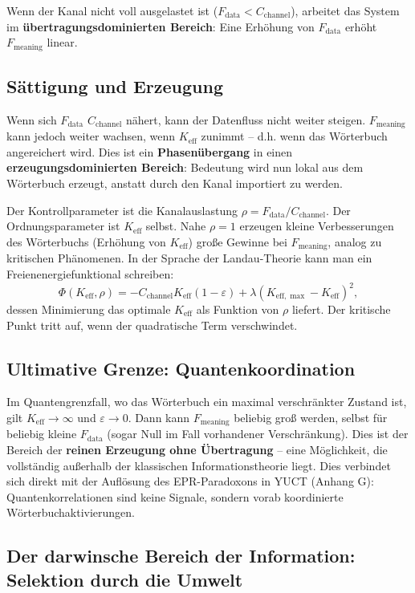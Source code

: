 \documentclass[12pt,a4paper]{article}
\theoremstyle{remark}
\newcommand{\Keff}{K_{\mathrm{eff}}}
\newcommand{\Keffmax}{K_{\mathrm{eff},\max}}
\begin{document}
	Wenn der Kanal nicht voll ausgelastet ist ($F_{\text{data}} < C_{\text{channel}}$), arbeitet das System im \textbf{übertragungsdominierten Bereich}: Eine Erhöhung von $F_{\text{data}}$ erhöht $F_{\text{meaning}}$ linear.
	
	\subsection{Sättigung und Erzeugung}
	
	Wenn sich $F_{\text{data}}$ $C_{\text{channel}}$ nähert, kann der Datenfluss nicht weiter steigen. $F_{\text{meaning}}$ kann jedoch weiter wachsen, wenn $\Keff$ zunimmt – d.h. wenn das Wörterbuch angereichert wird. Dies ist ein \textbf{Phasenübergang} in einen \textbf{erzeugungsdominierten Bereich}: Bedeutung wird nun lokal aus dem Wörterbuch erzeugt, anstatt durch den Kanal importiert zu werden.
	
	Der Kontrollparameter ist die Kanalauslastung $\rho = F_{\text{data}} / C_{\text{channel}}$. Der Ordnungsparameter ist $\Keff$ selbst. Nahe $\rho = 1$ erzeugen kleine Verbesserungen des Wörterbuchs (Erhöhung von $\Keff$) große Gewinne bei $F_{\text{meaning}}$, analog zu kritischen Phänomenen. In der Sprache der Landau-Theorie kann man ein Freienenergiefunktional schreiben:
	\[
	\Phi(\Keff, \rho) = -C_{\text{channel}} \Keff (1 - \varepsilon) + \lambda (\Keffmax - \Keff)^2,
	\]
	dessen Minimierung das optimale $\Keff$ als Funktion von $\rho$ liefert. Der kritische Punkt tritt auf, wenn der quadratische Term verschwindet.
	
	\subsection{Ultimative Grenze: Quantenkoordination}
	
	Im Quantengrenzfall, wo das Wörterbuch ein maximal verschränkter Zustand ist, gilt $\Keff \to \infty$ und $\varepsilon \to 0$. Dann kann $F_{\text{meaning}}$ beliebig groß werden, selbst für beliebig kleine $F_{\text{data}}$ (sogar Null im Fall vorhandener Verschränkung). Dies ist der Bereich der \textbf{reinen Erzeugung ohne Übertragung} – eine Möglichkeit, die vollständig außerhalb der klassischen Informationstheorie liegt. Dies verbindet sich direkt mit der Auflösung des EPR-Paradoxons in YUCT (Anhang G): Quantenkorrelationen sind keine Signale, sondern vorab koordinierte Wörterbuchaktivierungen.
	
	\subsection{Der darwinsche Bereich der Information: Selektion durch die Umwelt}
	\label{subsec:darwinian-regime}
	
\end{document}
